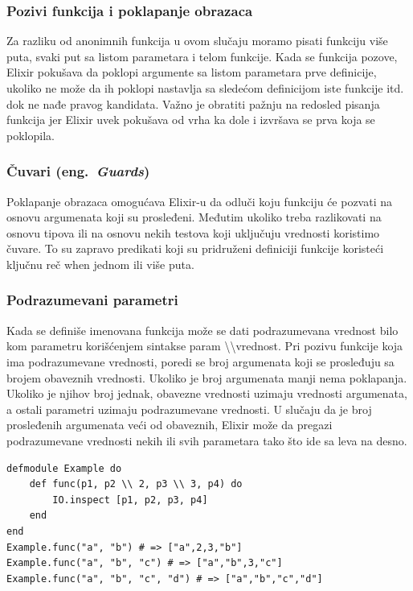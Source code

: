 \documentclass[a4paper]{article}
\begin{document}
\subsubsection{Pozivi funkcija i poklapanje obrazaca}
Za razliku od anonimnih funkcija u ovom slučaju moramo pisati funkciju više puta, svaki put sa listom parametara i telom funkcije. Kada se funkcija pozove, Elixir pokušava da poklopi argumente sa listom parametara prve definicije, ukoliko ne može da ih poklopi nastavlja sa sledećom definicijom iste funkcije itd. dok ne nađe pravog kandidata.
Važno je obratiti pažnju na redosled pisanja funkcija jer Elixir uvek pokušava od vrha ka dole i izvršava se prva koja se poklopila.

\subsubsection{Čuvari (eng.~{\em Guards})}
Poklapanje obrazaca omogućava Elixir-u da odluči koju funkciju će pozvati na osnovu argumenata koji su prosleđeni. Međutim ukoliko treba razlikovati na osnovu tipova ili na osnovu nekih testova koji uključuju vrednosti koristimo čuvare. To su zapravo predikati koji su pridruženi definiciji funkcije koristeći ključnu reč when jednom ili više puta. 

\subsubsection{Podrazumevani parametri}
Kada se definiše imenovana funkcija  može se dati podrazumevana vrednost bilo kom parametru korišćenjem sintakse  param \textbackslash \textbackslash  vrednost. Pri pozivu funkcije koja ima podrazumevane vrednosti, poredi se broj argumenata koji se prosleđuju sa brojem obaveznih vrednosti. Ukoliko je broj argumenata manji  nema poklapanja. Ukoliko je njihov broj jednak, obavezne vrednosti uzimaju vrednosti argumenata, a ostali parametri uzimaju podrazumevane vrednosti. U slučaju da je broj prosleđenih argumenata veći od obaveznih, Elixir može da pregazi podrazumevane vrednosti nekih ili svih parametara tako što ide sa leva na desno.
\begin{lstlisting}[caption={Poziv funkcije sa podrazumevanim parametrima}, label=simple]
defmodule Example do
    def func(p1, p2 \\ 2, p3 \\ 3, p4) do
        IO.inspect [p1, p2, p3, p4]
    end
end
Example.func("a", "b") # => ["a",2,3,"b"]
Example.func("a", "b", "c") # => ["a","b",3,"c"]
Example.func("a", "b", "c", "d") # => ["a","b","c","d"]
\end{lstlisting}
\end{document}
